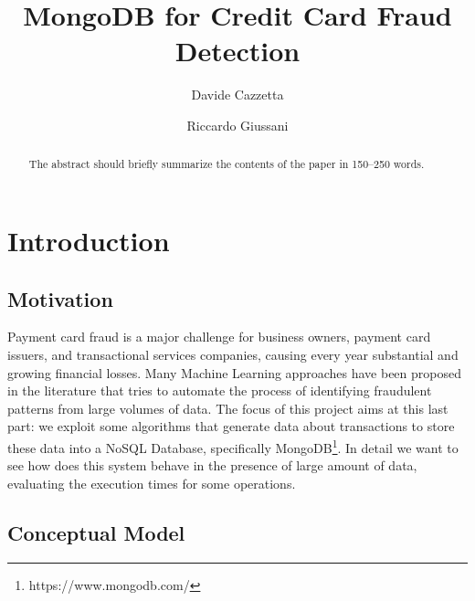 \documentclass[runningheads]{llncs}
\begin{document}
\title{MongoDB for Credit Card Fraud Detection}

\author{Davide Cazzetta \and Riccardo Giussani}

%
%
\maketitle              %
%
\begin{abstract}
The abstract should briefly summarize the contents of the paper in
150--250 words.

\end{abstract}

\section{Introduction}

\subsection{Motivation}

Payment card fraud is a major challenge for business owners, payment card issuers, and transactional services companies, causing every year substantial and growing financial losses. Many Machine Learning approaches have been proposed in the literature that tries to automate the process of identifying fraudulent patterns from large volumes of data. The focus of this project aims at this last part: we exploit some algorithms that generate data about transactions to store these data into a NoSQL Database, specifically MongoDB\footnote{https://www.mongodb.com/}. In detail we want to see how does this system behave in the presence of large amount of data, evaluating the execution times for some operations.

\subsection{Conceptual Model}
\end{document}
